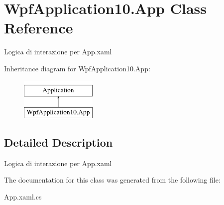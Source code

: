\hypertarget{class_wpf_application10_1_1_app}{}\section{Wpf\+Application10.\+App Class Reference}
\label{class_wpf_application10_1_1_app}


Logica di interazione per App.\+xaml  


Inheritance diagram for Wpf\+Application10.\+App\+:\begin{figure}[H]
\begin{center}
\leavevmode
\includegraphics[height=2.000000cm]{class_wpf_application10_1_1_app}
\end{center}
\end{figure}


\subsection{Detailed Description}
Logica di interazione per App.\+xaml 



The documentation for this class was generated from the following file\+:\begin{DoxyCompactItemize}
\item 
App.\+xaml.\+cs\end{DoxyCompactItemize}
